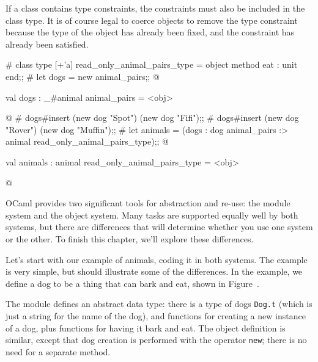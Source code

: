 If a class contains type constraints, the constraints must also be
included in the class type.  It is of course legal to coerce objects
to remove the type constraint because the type of the object has
already been fixed, and the constraint has already been satisfied.

\begin{ocaml}
# class type [+'a] read_only_animal_pairs_type =
    object method eat : unit end;;
# let dogs = new animal_pairs;;
@
\begin{topoutput}
val dogs : _#animal animal_pairs = <obj>
\end{topoutput}
@
# dogs#insert (new dog "Spot") (new dog "Fifi");;
# dogs#insert (new dog "Rover") (new dog "Muffin");;
# let animals = (dogs : dog animal_pairs :> animal read_only_animal_pairs_type);;
@
\begin{topoutput}
val animals : animal read_only_animal_pairs_type = <obj>
\end{topoutput}
@
\end{ocaml}


OCaml provides two significant tools for abstraction and re-use: the
module system and the object system.  Many tasks are supported equally
well by both systems, but there are differences that will determine
whether you use one system or the other.  To finish this chapter,
we'll explore these differences.


Let's start with our example of animals, coding it in both systems.
The example is very simple, but should illustrate some of the
differences.  In the example, we define a dog to be a thing that can
bark and eat, shown in Figure~.

The module defines an abstract data type: there is a type of
dogs \hbox{\lstinline$Dog.t$} (which is just a string for the name of the
dog), and functions for creating a new instance of a dog, plus
functions for having it bark and eat.  The object definition is
similar, except that dog creation is performed with the
operator \hbox{\lstinline$new$}; there is no need for a separate method.

